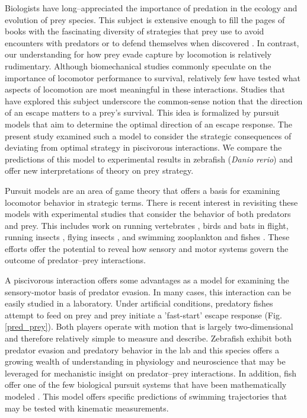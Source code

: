 \documentclass[12pt]{article}
\begin{document}
Biologists have long--appreciated the importance of predation in the ecology and evolution of prey species. This subject is extensive enough to fill the pages of books with the fascinating diversity of strategies that prey use to avoid encounters with predators \citep[e.g.][]{Ruxton:2004vb} or to defend themselves when discovered \citep[e.g.][]{Emlen:2014wb, Evans:1990va}. In contrast, our understanding for how prey evade capture by locomotion is relatively rudimentary. Although biomechanical studies commonly speculate on the importance of locomotor performance to survival, relatively few have tested what aspects of locomotion are most meaningful in these interactions. Studies that have explored this subject \citep[reviewed by][]{Domenici:2011tv} underscore the common-sense notion that the direction of an escape matters to a prey's survival. This idea is formalized by pursuit models that aim to determine the optimal direction of an escape response. The present study examined such a model \citep{Weihs:1984tb} to consider the strategic consequences of deviating from optimal strategy in piscivorous interactions. We compare the predictions of this model to experimental results in zebrafish (\textit{Danio rerio}) \citep{Stewart:2014cm} and offer new interpretations of theory on prey strategy.

Pursuit models are an area of game theory that offers a basis for examining locomotor behavior in strategic terms. There is recent interest in revisiting these models \citep[e.g.][]{Howland:1974, Weihs:1984tb} with experimental studies that consider the behavior of both predators and prey. This includes work on running vertebrates \citep[e.g.][]{Wilson:2014fd}, birds \citep[e.g.][]{Hedenstrom:2001do, Kullberg:1998ur} and bats \citep[e.g.][]{Ghose:2006dk} in flight, running insects \citep{Domenici:2008kra}, flying insects \citep[e.g.][]{Combes:2012eta}, and swimming zooplankton \citep[e.g.][]{Arnott:1999wx, Heuch:2007kk} and fishes \citep[e.g.][]{Domenici:2000un}. These efforts offer the potential to reveal how sensory and motor systems govern the outcome of predator--prey interactions. 

A piscivorous interaction offers some advantages as a model for examining the sensory-motor basis of predator evasion. In many cases, this interaction can be easily studied in a laboratory. Under artificial conditions, predatory fishes attempt to feed on prey and prey initiate a 'fast-start' escape response (Fig. \ref{pred_prey}). Both players operate with motion that is largely two-dimensional and therefore relatively simple to measure and describe. Zebrafish exhibit both predator evasion and predatory behavior in the lab \citep{Stewart:2013bh} and this species offers a growing wealth of understanding in physiology and neuroscience \citep[e.g.][]{McLean:2011gi, Briggs:2002uf} that may be leveraged for mechanistic insight on predator--prey interactions. In addition, fish offer one of the few biological pursuit systems that have been mathematically modeled \citep{Weihs:1984tb}. This model offers specific predictions of swimming trajectories that may be tested with kinematic measurements. 
\end{document}
